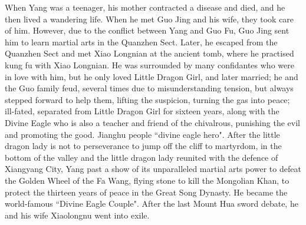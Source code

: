 \documentclass[doctor, vlined]{DissertUESTC}
\begin{document}

	
	
	
	
	\enabstract
	
	When Yang was a teenager, his mother contracted a disease and died, and he then lived a wandering life. When he met Guo Jing and his wife, they took care of him. However, due to the conflict between Yang and Guo Fu, Guo Jing sent him to learn martial arts in the Quanzhen Sect. Later, he escaped from the Quanzhen Sect and met Xiao Longnian at the ancient tomb, where he practised kung fu with Xiao Longnian. He was surrounded by many confidantes who were in love with him, but he only loved Little Dragon Girl, and later married; he and the Guo family feud, several times due to misunderstanding tension, but always stepped forward to help them, lifting the suspicion, turning the gas into peace; ill-fated, separated from Little Dragon Girl for sixteen years, along with the Divine Eagle who is also a teacher and friend of the chivalrous, punishing the evil and promoting the good. Jianghu people ``divine eagle hero". After the little dragon lady is not to perseverance to jump off the cliff to martyrdom, in the bottom of the valley and the little dragon lady reunited with the defence of Xiangyang City, Yang past a show of its unparalleled martial arts power to defeat the Golden Wheel of the Fa Wang, flying stone to kill the Mongolian Khan, to protect the thirteen years of peace in the Great Song Dynasty. He became the world-famous ``Divine Eagle Couple". After the last Mount Hua sword debate, he and his wife Xiaolongnu went into exile.
\end{document}
